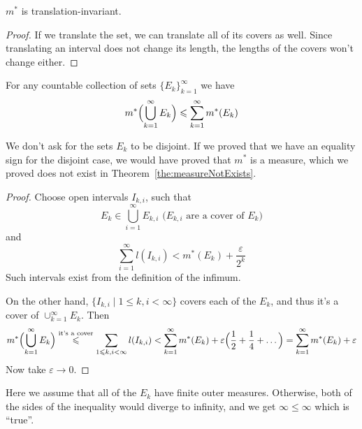 \begin{lemma}
    $m^*$ is translation-invariant.
\end{lemma}
\begin{proof}
    If we translate the set, we can translate all of its 
    covers as well. Since translating an interval does not
    change its length, the lengths of the covers won't change either.
\end{proof}

\begin{proposition}
    \label{the:countableSubadditivity}
    For any countable collection of sets
    $\{E_k\}_{k=1}^\infty$ we have 
    \[ m^*\Bigl(\bigcup_{k=1}^\infty E_k\Bigr) \le \sum_{k=1}^\infty m^*(E_k) \]
\end{proposition}
\begin{remark}
    We don't ask for the sets $E_k$ to be disjoint. 
    If we proved that we have an equality sign for the disjoint case,
    we would have proved that $m^*$ is a measure, which we proved does not exist
    in Theorem~\ref{the:measureNotExists}.
\end{remark}
\begin{proof}
    Choose open intervals $I_{k,i}$, such that
    \[E_k \in \bigcup_{i=1}^\infty E_{k,i} \text{ ($E_{k, i}$ are a cover of $E_k$)}\] and
    \[\sum_{i=1}^\infty l(I_{k,i}) < m^*(E_k) + \frac{\varepsilon}{2^k}\]
    Such intervals exist from the definition of the infimum.

    On the other hand, $\{ I_{k,i} \mid 1 \le k, i < \infty \}$
    covers each of the $E_k$, and thus it's a cover of
    $\cup_{k=1}^\infty E_k$.
    Then 
    \[ 
        m^*\Bigl(\bigcup_{k=1}^\infty E_k\Bigr) \overset{\text{it's a cover}}{\le}
        \sum_{1 \le k, i < \infty} l(I_{k,i}) <
        \sum_{k=1}^\infty m^*(E_k) + \varepsilon \Bigl(\frac{1}{2} + \frac{1}{4} + \dots\Bigr) =
        \sum_{k=1}^\infty m^*(E_k) + \varepsilon
    \]
    Now take $\varepsilon \to 0$.
\end{proof}
\begin{remark}
    Here we assume that all of the $E_k$ have finite outer measures.
    Otherwise, both of the sides of the inequality would diverge
    to infinity, and we get $\infty \le \infty$ which is ``true''.
\end{remark}

\pagebreak
